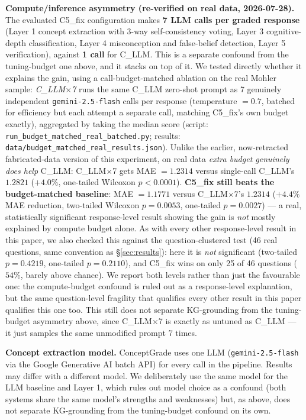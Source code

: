 \documentclass[conference]{IEEEtran}
\begin{document}
\textbf{Compute/inference asymmetry (re-verified on real data,
2026-07-28).} The evaluated C5\_fix configuration makes \textbf{7 LLM
calls per graded response} (Layer 1 concept extraction with 3-way
self-consistency voting, Layer 3 cognitive-depth classification, Layer
4 misconception and false-belief detection, Layer 5 verification),
against \textbf{1 call} for C\_LLM. This is a separate confound from
the tuning-budget one above, and it stacks on top of it. We tested
directly whether it explains the gain, using a call-budget-matched
ablation on the real Mohler sample: \textit{C\_LLM$\times$7} runs the
same C\_LLM zero-shot prompt as 7 genuinely independent
\texttt{gemini-2.5-flash} calls per response (temperature $=0.7$,
batched for efficiency but each attempt a separate call, matching
C5\_fix's own budget exactly), aggregated by taking the median score
(script: \texttt{run\_budget\_matched\_real\_batched.py}; results:
\texttt{data/budget\_matched\_real\_results.json}). Unlike the earlier,
now-retracted fabricated-data version of this experiment, on real data
\emph{extra budget genuinely does help} C\_LLM: C\_LLM$\times$7 gets
MAE $=1.2314$ versus single-call C\_LLM's $1.2821$ ($+4.0\%$, one-tailed
Wilcoxon $p<0.0001$). \textbf{C5\_fix still beats the budget-matched
baseline}: MAE $=1.1771$ versus C\_LLM$\times$7's $1.2314$ ($+4.4\%$ MAE
reduction, two-tailed Wilcoxon $p=0.0053$, one-tailed $p=0.0027$) --- a
real, statistically significant response-level result showing the gain
is \emph{not} mostly explained by compute budget alone. As with every
other response-level result in this paper, we also checked this against
the question-clustered test (46 real questions, same convention as
\S\ref{sec:results}): here it is \emph{not} significant (two-tailed
$p=0.4219$, one-tailed $p=0.2110$), and C5\_fix wins on only 25 of 46
questions ($54\%$, barely above chance). We report both levels rather
than just the favourable one: the compute-budget confound is ruled out
as a response-level explanation, but the same question-level fragility
that qualifies every other result in this paper qualifies this one too.
This still does not separate KG-grounding from the tuning-budget
asymmetry above, since C\_LLM$\times$7 is exactly as untuned as C\_LLM
--- it just samples the same unmodified prompt 7 times.

\textbf{Concept extraction model.} ConceptGrade uses one LLM
(\texttt{gemini-2.5-flash} via the Google Generative AI batch API) for
every call in the pipeline. Results may differ with a different model.
We deliberately use the same model for the LLM baseline and Layer 1,
which rules out model choice as a confound (both systems share the same
model's strengths and weaknesses) but, as above, does not separate
KG-grounding from the tuning-budget confound on its own.
\end{document}
